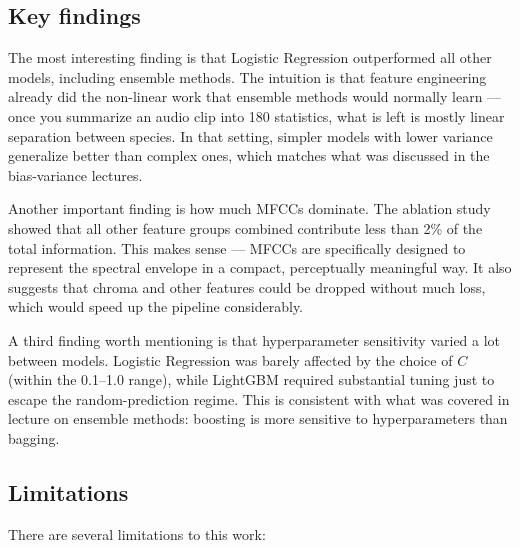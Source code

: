 \documentclass[11pt,a4paper]{article}
\begin{document}
\subsection{Key findings}

The most interesting finding is that Logistic Regression outperformed all other models, including ensemble methods. The intuition is that feature engineering already did the non-linear work that ensemble methods would normally learn — once you summarize an audio clip into 180 statistics, what is left is mostly linear separation between species. In that setting, simpler models with lower variance generalize better than complex ones, which matches what was discussed in the bias-variance lectures.

Another important finding is how much MFCCs dominate. The ablation study showed that all other feature groups combined contribute less than 2\% of the total information. This makes sense — MFCCs are specifically designed to represent the spectral envelope in a compact, perceptually meaningful way. It also suggests that chroma and other features could be dropped without much loss, which would speed up the pipeline considerably.

A third finding worth mentioning is that hyperparameter sensitivity varied a lot between models. Logistic Regression was barely affected by the choice of $C$ (within the 0.1--1.0 range), while LightGBM required substantial tuning just to escape the random-prediction regime. This is consistent with what was covered in lecture on ensemble methods: boosting is more sensitive to hyperparameters than bagging.

\subsection{Limitations}

There are several limitations to this work:
\end{document}
